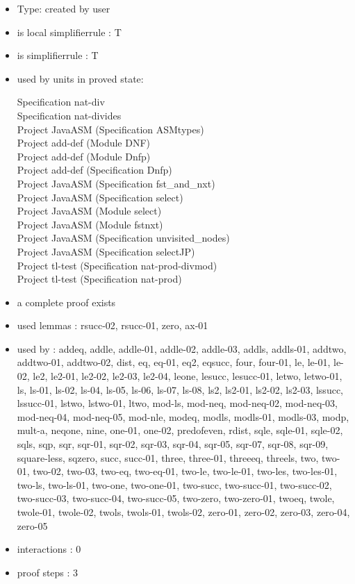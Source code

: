\documentclass[a4paper]{article}
\begin{document}
\begin{itemize}

\item Type: created by user

\item is local simplifierrule : T
\item is simplifierrule : T
\item used by units in proved state:

Specification nat-div \\
Specification nat-divides \\
Project JavaASM (Specification ASMtypes) \\
Project add-def (Module DNF) \\
Project add-def (Module Dnfp) \\
Project add-def (Specification Dnfp) \\
Project JavaASM (Specification fst\_and\_nxt) \\
Project JavaASM (Specification select) \\
Project JavaASM (Module select) \\
Project JavaASM (Module fstnxt) \\
Project JavaASM (Specification unvisited\_nodes) \\
Project JavaASM (Specification selectJP) \\
Project tl-test (Specification nat-prod-divmod) \\
Project tl-test (Specification nat-prod)
\item       a complete proof exists
\item       used lemmas  : rsucc-02, rsucc-01, zero, ax-01
\item       used by      : addeq, addle, addle-01, addle-02, addle-03, addls, addls-01, addtwo, addtwo-01, addtwo-02, dist, eq, eq-01, eq2, eqsucc, four, four-01, le, le-01, le-02, le2, le2-01, le2-02, le2-03, le2-04, leone, lesucc, lesucc-01, letwo, letwo-01, ls, ls-01, ls-02, ls-04, ls-05, ls-06, ls-07, ls-08, ls2, ls2-01, ls2-02, ls2-03, lssucc, lssucc-01, lstwo, lstwo-01, ltwo, mod-ls, mod-neq, mod-neq-02, mod-neq-03, mod-neq-04, mod-neq-05, mod-nle, modeq, modls, modls-01, modls-03, modp, mult-a, neqone, nine, one-01, one-02, predofeven, rdist, sqle, sqle-01, sqle-02, sqls, sqp, sqr, sqr-01, sqr-02, sqr-03, sqr-04, sqr-05, sqr-07, sqr-08, sqr-09, square-less, sqzero, succ, succ-01, three, three-01, threeeq, threels, two, two-01, two-02, two-03, two-eq, two-eq-01, two-le, two-le-01, two-les, two-les-01, two-ls, two-ls-01, two-one, two-one-01, two-succ, two-succ-01, two-succ-02, two-succ-03, two-succ-04, two-succ-05, two-zero, two-zero-01, twoeq, twole, twole-01, twole-02, twols, twols-01, twols-02, zero-01, zero-02, zero-03, zero-04, zero-05
\item       interactions : 0
\item       proof steps  : 3
\end{itemize}
\end{document}
